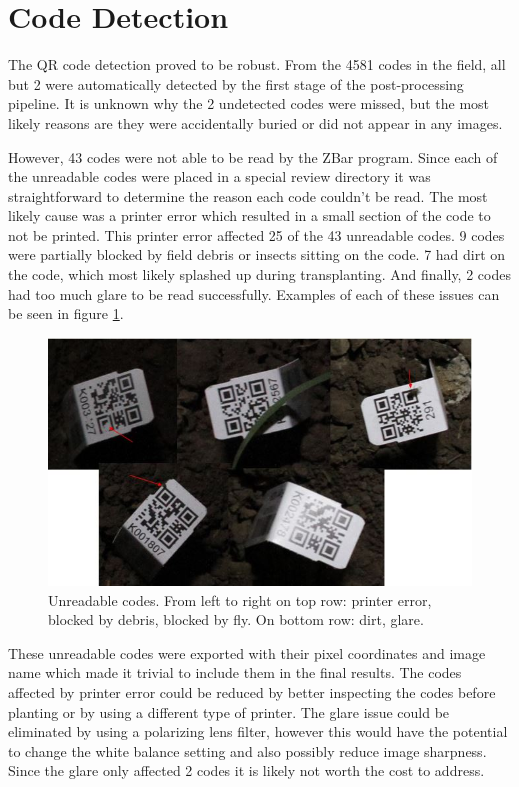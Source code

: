 \section{Code Detection}

The QR code detection proved to be robust. From the 4581 codes in the field, all but 2 were automatically detected by the first stage of the post-processing pipeline.  It is unknown why the 2 undetected codes were missed, but the most likely reasons are they were accidentally buried or did not appear in any images.  

However, 43 codes were not able to be read by the ZBar program.  Since each of the unreadable codes were placed in a special review directory it was straightforward to determine the reason each code couldn't be read.  The most likely cause was a printer error which resulted in a small section of the code to not be printed.  This printer error affected 25 of the 43 unreadable codes.  9 codes were partially blocked by field debris or insects sitting on the code.  7 had dirt on the code, which most likely splashed up during transplanting. And finally, 2 codes had too much glare to be read successfully.  Examples of each of these issues can be seen in figure \ref{figure:missed_codes}. 

\begin{figure}
	\centering
    \includegraphics[width=5in]{figures/missed_codes.jpg}
    \caption[Unreadable QR codes]{Unreadable codes.  From left to right on top row: printer error, blocked by debris, blocked by fly. On bottom row: dirt, glare.}
    \label{figure:missed_codes}
\end{figure}

These unreadable codes were exported with their pixel coordinates and image name which made it trivial to include them in the final results. The codes affected by printer error could be reduced by better inspecting the codes before planting or by using a different type of printer.  The glare issue could be eliminated by using a polarizing lens filter, however this would have the potential to change the white balance setting and also possibly reduce image sharpness.  Since the glare only affected 2 codes it is likely not worth the cost to address.  

